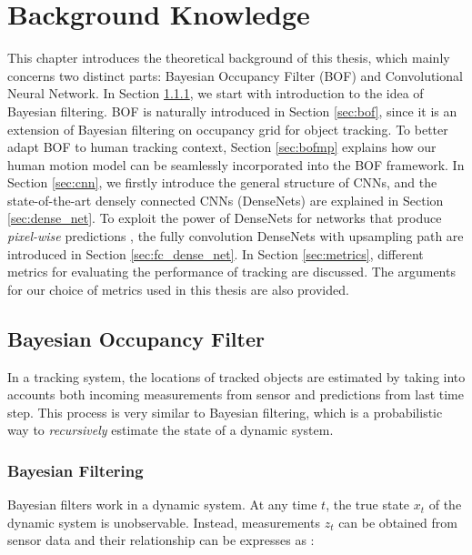 \chapter{Background Knowledge} \label{chapter:3}

This chapter introduces the theoretical background of this thesis, which mainly concerns two distinct parts: Bayesian Occupancy Filter (BOF) and Convolutional Neural Network. In Section \ref{sec:bayes_filtering}, we start with introduction to the idea of Bayesian filtering. BOF is naturally introduced in Section \ref{sec:bof}, since it is an extension of Bayesian filtering on occupancy grid for object tracking. To better adapt BOF to human tracking context, Section \ref{sec:bofmp} explains how our human motion model can be seamlessly incorporated into the BOF framework. In Section \ref{sec:cnn}, we firstly introduce the general structure of CNNs, and the state-of-the-art densely connected CNNs (DenseNets) are explained in Section \ref{sec:dense_net}. To exploit the power of DenseNets for networks that produce \textit{pixel-wise} predictions , the fully convolution DenseNets with upsampling path are introduced in Section \ref{sec:fc_dense_net}. In Section \ref{sec:metrics}, different metrics for evaluating the performance of tracking are discussed. The arguments for our choice of metrics used in this thesis are also provided. 

\section{Bayesian Occupancy Filter} 

In a tracking system, the locations of tracked objects are estimated by taking into accounts both incoming measurements from sensor and predictions from last time step. This process is very similar to Bayesian filtering, which is a probabilistic way to \textit{recursively} estimate the state of a dynamic system.

\subsection{Bayesian Filtering} \label{sec:bayes_filtering}

Bayesian filters work in a dynamic system. At any time $t$, the true state $x_t$ of the dynamic system is unobservable. Instead, measurements $z_t$ can be obtained from sensor data and their relationship can be expresses as \citep{jazwinski2007stochastic}:

